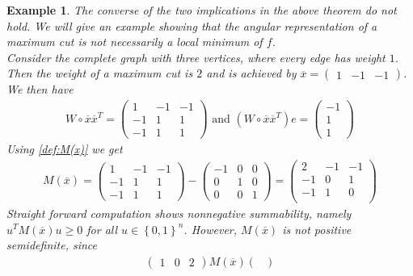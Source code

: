 \documentclass[12pt,a4paper]{article}
\theoremstyle{mythm}
\newtheorem*{exa}{Example}
\begin{document}
\begin{exa}
The converse of the two implications in the above theorem do not hold. We will give an example showing that the angular representation of a maximum cut is not necessarily a
local minimum of $ f $. \\
Consider the complete graph with three vertices, where every edge has weight $ 1 $.
Then the weight of a maximum cut is $ 2 $ and is achieved by 
$ \overline{ x } = \begin{pmatrix}
1 & -1 & -1
\end{pmatrix}   $.
We then have 
\begin{align*}
W \circ \overline{ x } \overline{ x } ^T = \begin{pmatrix}
1 & -1 & -1 \\
-1 &1 & 1 \\
-1 & 1 & 1
\end{pmatrix} 
\text{ and } 
\left( W \circ \overline{ x } \overline{ x } ^T \right)  e = \begin{pmatrix}
-1 \\
1 \\
1
\end{pmatrix} 
\end{align*} 
Using \ref{def:M(x)} we get
\begin{align*}
M( \overline{ x } ) = 
\begin{pmatrix}
1 & -1 & -1 \\
-1 &1 & 1 \\
-1 & 1 & 1
\end{pmatrix} 
- 
\begin{pmatrix}
-1 & 0 & 0 \\
0 & 1 & 0 \\
0 & 0 & 1
\end{pmatrix} 
= \begin{pmatrix}
2 & -1 & -1 \\
-1 & 0 & 1 \\
-1 & 1 & 0 \\
\end{pmatrix} 
\end{align*} 
Straight forward computation shows nonnegative summability, namely $ u ^T M ( \overline{ x } ) u \geq 0  $ for all $ u \in \left\{ 0,1 \right\} ^{ n }  $.
However, $ M ( \overline{ x } )  $ is not positive semidefinite, since
\begin{align*}
\begin{pmatrix}
1 & 0 & 2
\end{pmatrix} 
M ( \overline{ x } ) 
\begin{pmatrix}

\end{pmatrix}
\end{align*}
\end{exa}
\end{document}
